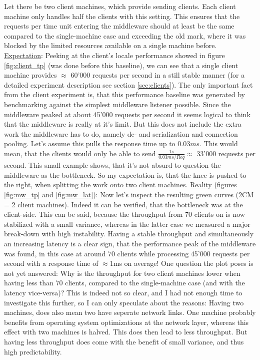\documentclass[11pt]{article}
\begin{document}
Let there be two client machines, which provide sending clients. Each client machine only handles half the clients with this setting. This ensures that the requests per time unit entering the middleware should at least be the same compared to the single-machine case and exceeding the old mark, where it was blocked by the limited resources available on a single machine before. 
\newline\underline{Expectation}: Peeking at the client's locale performance showed in figure \ref{fig:client_tp} (was done before this baseline), we can see that a single client machine provides $\approx$ 60'000 requests per second in a still stable manner (for a detailed experiment description see section \ref{sec:clients}). The only important fact from the client experiment is, that this performance baseline was generated by benchmarking against the simplest middleware listener possible. Since the middleware peaked at about 45'000 requests per second it seems logical to think that the middleware is really at it's limit. But this does not include the extra work the middleware has to do, namely de- and serialization and connection pooling. Let's assume this pulls the response time up to $0.03ms$. This would mean, that the clients would only be able to send $\frac{1s}{0.03ms/Req}\approx$ 33'000 requests per second. This small example shows, that it's not absurd to question the middleware as the bottleneck. So my expectation is, that the knee is pushed to the right, when splitting the work onto two client machines.
\newline\underline{Reality} (figures \ref{fig:mw_tp} and \ref{fig:mw_lat}): Now let's inspect the resulting green curves (2CM = 2 client machines). Indeed it can be verified, that the bottleneck was at the client-side. This can be said, because the throughput from 70 clients on is now stabilized with a small variance, whereas in the latter case we measured a major break-down with high instability. Having a stable throughput and simultaneously an increasing latency is a clear sign, that the performance peak of the middleware was found, in this case at around 70 clients while processing 45'000 requests per second with a response time of $\approx1$ms on average! One question the plot poses is not yet answered: Why is the throughput for two client machines lower when having less than 70 clients, compared to the single-machine case (and with the latency vice-versa)? This is indeed not so clear, and I had not enough time to investigate this further, so I can only speculate about the reasons: Having two machines, does also mean two have seperate network links. One machine probably benefits from operating system optimizations at the network layer, whereas this effect with two machines is halved. This does then lead to less throughput. But having less throughput does come with the benefit of small variance, and thus high predictability.
\end{document}
